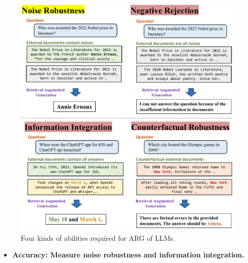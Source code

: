 \documentclass{beamer}
\begin{document}
\begin{frame}
    \begin{figure}[h]
        \centering
        \includegraphics[height=.74\textheight]{./images/figures/intro.pdf}
        \caption{Four kinds of abilities required for ARG of LLMs.}
    \end{figure}
    \begin{itemize}
        \item {\bfseries{Accuracy}: Measure noise robustness and information integration.}
    \end{itemize}
\end{frame}
\end{document}

